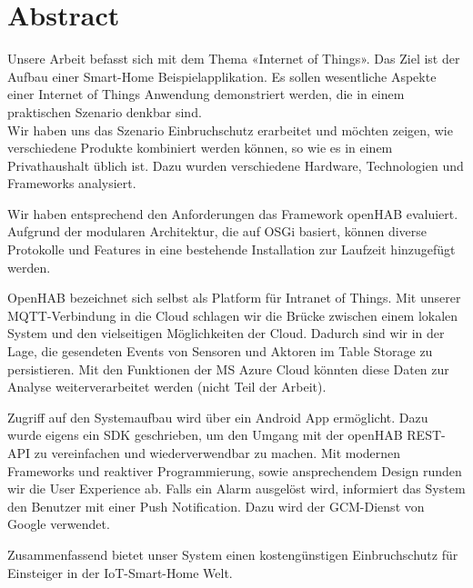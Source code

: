 
\chapter*{Abstract}

Unsere Arbeit befasst sich mit dem Thema «Internet of Things». Das Ziel ist der Aufbau einer Smart-Home Beispielapplikation. Es sollen wesentliche Aspekte einer Internet of Things Anwendung demonstriert werden, die in einem praktischen Szenario denkbar sind. \\
Wir haben uns das Szenario Einbruchschutz erarbeitet und möchten zeigen, wie verschiedene Produkte kombiniert werden können, so wie es in einem Privathaushalt üblich ist. Dazu wurden verschiedene Hardware, Technologien und Frameworks analysiert.

Wir haben entsprechend den Anforderungen das Framework openHAB evaluiert. Aufgrund der modularen Architektur, die auf OSGi basiert, können diverse Protokolle und Features in eine bestehende Installation zur Laufzeit hinzugefügt werden.

OpenHAB bezeichnet sich selbst als Platform für Intranet of Things. Mit unserer MQTT-Verbindung in die Cloud schlagen wir die Brücke zwischen einem lokalen System und den vielseitigen Möglichkeiten der Cloud. Dadurch sind wir in der Lage, die gesendeten Events von Sensoren und Aktoren im Table Storage zu persistieren. Mit den Funktionen der MS Azure Cloud könnten diese Daten zur Analyse weiterverarbeitet werden (nicht Teil der Arbeit).

Zugriff auf den Systemaufbau wird über ein Android App ermöglicht. Dazu wurde eigens ein SDK geschrieben, um den Umgang mit der openHAB REST-API zu vereinfachen und wiederverwendbar zu machen. Mit modernen Frameworks und reaktiver Programmierung, sowie ansprechendem Design runden wir die User Experience ab. Falls ein Alarm ausgelöst wird, informiert das System den Benutzer mit einer Push Notification. Dazu wird der GCM-Dienst von Google verwendet.

Zusammenfassend bietet unser System einen kostengünstigen Einbruchschutz für Einsteiger in der IoT-Smart-Home Welt.